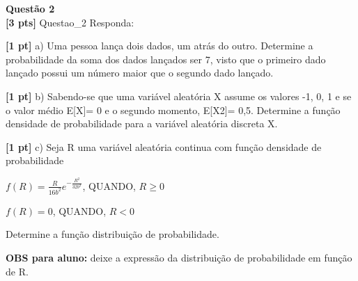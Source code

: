 \documentclass{article}
\newenvironment{problem}[2][Questão]
    { \begin{mdframed}[backgroundcolor=gray!20] \textbf{#1 #2} \\}
    {  \end{mdframed}}
\begin{document}
\begin{problem}{2}
\textbf{[3 pts]} Questao\_2 Responda: 

\textbf{[1 pt]} a) Uma pessoa lança dois dados, um atrás do outro. Determine a probabilidade da soma dos dados lançados ser 7, visto que o primeiro dado lançado possui um número maior que o segundo dado lançado.

\textbf{[1 pt]} b) Sabendo-se que uma variável aleatória X assume os valores -1, 0, 1 e se o valor médio E[X]= 
0  e  o  segundo  momento,  E[X2]=  0,5. Determine  a  função  densidade  de  probabilidade  para  a 
variável aleatória discreta X. 
 
\textbf{[1 pt]} c) Seja R uma variável aleatória continua com função densidade de probabilidade

$f(R) = \frac{R}{16b^{2}} e^{-\frac{R^{2}}{32b^{2}}}$, QUANDO, $R \geq 0$

$f(R) = 0$, QUANDO, $R < 0$

Determine a função distribuição de probabilidade.  

\textbf{OBS para aluno:} deixe a expressão da distribuição de probabilidade em função de R.

\end{problem}
\end{document}
